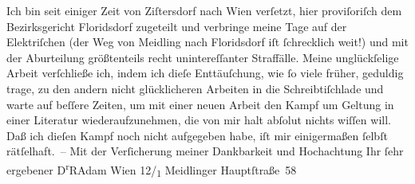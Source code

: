 \begin{ledgroupsized}[t]{13cm}
           \pstart
           Ich bin seit einiger Zeit von Ziſtersdorf nach Wien verſetzt, hier proviſoriſch dem Bezirksgericht Floridsdorf zugeteilt und verbringe meine Tage auf
               der Elektriſchen (der Weg von Meidling nach Floridsdorf iſt ſchrecklich weit!) und mit der
               Aburteilung größtenteils recht unintereſſanter Straffälle.\pend
           \pstart
           Meine unglückſelige Arbeit verſchließe ich, indem ich dieſe Enttäuſchung, wie ſo
               viele früher, geduldig trage, zu den andern nicht glücklicheren Arbeiten in die
               Schreibtiſchlade und warte auf beſſere Zeiten, um mit einer neuen Arbeit den Kampf um
               Geltung in einer Literatur wiederaufzunehmen, die von mir halt abſolut nichts wiſſen
               will. Daß ich die{\pb}ſen Kampf noch nicht aufgegeben
               habe, iſt mir einigermaßen ſelbſt rätſelhaft. –\pend
           \pstart
           Mit der Verſicherung meiner Dankbarkeit und Hochachtung Ihr ſehr ergebener\pend
           \pstart \spacefill\mbox{D\textsuperscript{r}RAdam}\pend{}\pstart
           \noindent{}Wien 12/\textsubscript{1} Meidlinger
                     Hauptſtraße 58\pend
           
         
         \endnumbering{}\end{ledgroupsized}  \newcommand{\dateiname}{L02219}\newcommand{\titel}{Robert Adam an Arthur Schnitzler, 26. 9. 1915}\newcommand{\editorInnen}{Martin Anton Müller und Gerd-Hermann Susen}
      